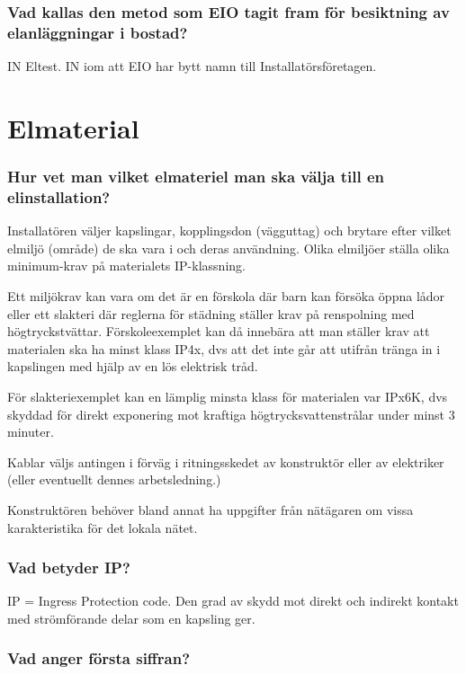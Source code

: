 \documentclass[a4paper,swedish]{article}
\begin{document}
\setcounter{section}{68}
\section{Vad kallas den metod som EIO tagit fram för besiktning av elanläggningar i bostad?}

IN Eltest. IN iom att EIO har bytt namn till Installatörsföretagen.

\part{Elmaterial}

\setcounter{section}{0}
\section{Hur vet man vilket elmateriel man ska välja till en elinstallation?}

Installatören väljer kapslingar, kopplingsdon (vägguttag) och brytare efter vilket elmiljö (område)
de ska vara i och deras användning. Olika elmiljöer ställa olika minimum-krav på materialets IP-klassning.

Ett miljökrav kan vara om det är en förskola där barn kan försöka öppna lådor eller ett slakteri där
reglerna för städning ställer krav på renspolning med högtryckstvättar. Förskoleexemplet kan då innebära att
man ställer krav att materialen ska ha minst klass IP4x, dvs att det inte går att utifrån tränga in i
kapslingen med hjälp av en lös elektrisk tråd.

För slakteriexemplet kan en lämplig minsta klass för materialen var IPx6K, dvs skyddad för direkt
exponering mot kraftiga högtrycksvattenstrålar under minst 3 minuter.

Kablar väljs antingen i förväg i ritningsskedet av konstruktör eller av
elektriker (eller eventuellt dennes arbetsledning.)

Konstruktören behöver bland annat ha uppgifter från nätägaren om vissa karakteristika
för det lokala nätet.

\setcounter{section}{2}
\section{Vad betyder IP?}

IP = Ingress Protection code.
Den grad av skydd mot direkt och indirekt kontakt med strömförande delar som en kapsling ger.

\setcounter{section}{4}
\section{Vad anger första siffran?}
\end{document}
